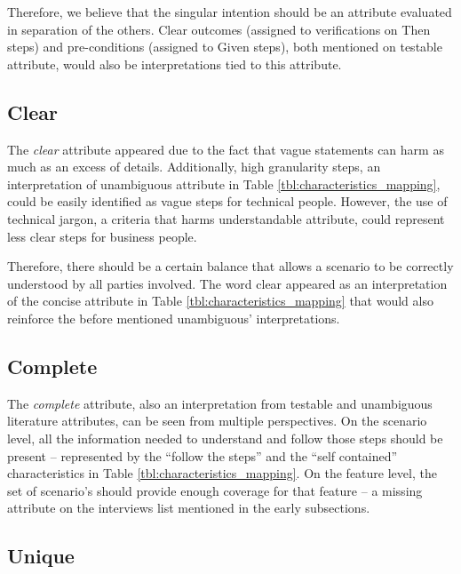 Therefore, we believe that the singular intention should be an attribute evaluated in separation of the others. Clear outcomes (assigned to verifications on Then steps) and pre-conditions (assigned to Given steps), both mentioned on testable attribute, would also be interpretations tied to this attribute.


\subsection{Clear}

The \textit{clear} attribute appeared due to the fact that vague statements can harm as much as an excess of details. Additionally, high granularity steps, an interpretation of unambiguous attribute in Table \ref{tbl:characteristics_mapping}, could be easily identified as vague steps for technical people. However, the use of technical jargon, a criteria that harms understandable attribute, could represent less clear steps for business people.

Therefore, there should be a certain balance that allows a scenario to be correctly understood by all parties involved. The word clear appeared as an interpretation of the concise attribute in Table \ref{tbl:characteristics_mapping} that would also reinforce the before mentioned unambiguous' interpretations.


\subsection{Complete}

The \textit{complete} attribute, also an interpretation from testable and unambiguous literature attributes, can be seen from multiple perspectives. On the scenario level, all the information needed to understand and follow those steps should be present -- represented by the ``follow the steps'' and the ``self contained'' characteristics in Table \ref{tbl:characteristics_mapping}. On the feature level, the set of scenario's should provide enough coverage for that feature -- a missing attribute on the interviews list mentioned in the early subsections.

\subsection{Unique}

